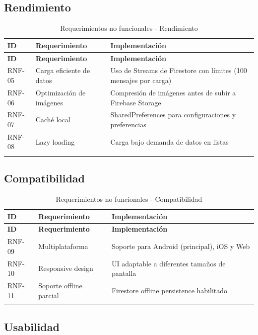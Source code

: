 \documentclass[12pt,a4paper]{article}
\begin{document}
\subsection{Rendimiento}

\begin{longtable}{|p{1.5cm}|p{4cm}|p{8cm}|}
\hline
\textbf{ID} & \textbf{Requerimiento} & \textbf{Implementación} \\
\hline
\endfirsthead
\hline
\textbf{ID} & \textbf{Requerimiento} & \textbf{Implementación} \\
\hline
\endhead
RNF-05 & Carga eficiente de datos & Uso de Streams de Firestore con límites (100 mensajes por carga) \\
\hline
RNF-06 & Optimización de imágenes & Compresión de imágenes antes de subir a Firebase Storage \\
\hline
RNF-07 & Caché local & SharedPreferences para configuraciones y preferencias \\
\hline
RNF-08 & Lazy loading & Carga bajo demanda de datos en listas \\
\hline
\caption{Requerimientos no funcionales - Rendimiento}
\end{longtable}

\subsection{Compatibilidad}

\begin{longtable}{|p{1.5cm}|p{4cm}|p{8cm}|}
\hline
\textbf{ID} & \textbf{Requerimiento} & \textbf{Implementación} \\
\hline
\endfirsthead
\hline
\textbf{ID} & \textbf{Requerimiento} & \textbf{Implementación} \\
\hline
\endhead
RNF-09 & Multiplataforma & Soporte para Android (principal), iOS y Web \\
\hline
RNF-10 & Responsive design & UI adaptable a diferentes tamaños de pantalla \\
\hline
RNF-11 & Soporte offline parcial & Firestore offline persistence habilitado \\
\hline
\caption{Requerimientos no funcionales - Compatibilidad}
\end{longtable}

\subsection{Usabilidad}
\end{document}
